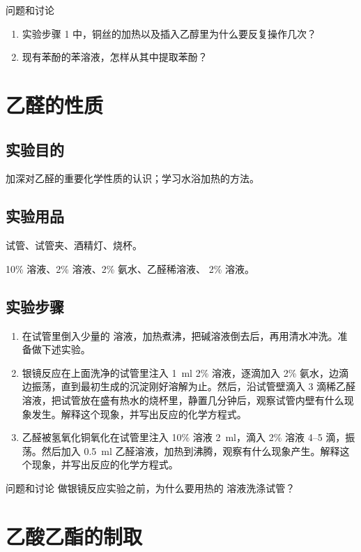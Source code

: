 \begin{Theorem}{问题和讨论}
\begin{enumerate}[1.]
  \item 实验步骤 1 中，铜丝的加热以及插入乙醇里为什么要反复操作几次？
  \item 现有苯酚的苯溶液，怎样从其中提取苯酚？
\end{enumerate}
\end{Theorem}

\section{乙醛的性质}
\subsection*{实验目的}
加深对乙醛的重要化学性质的认识；学习水浴加热的方法。

\subsection*{实验用品}
试管、试管夹、酒精灯、烧杯。

10\%  溶液、2\%  溶液、2\% 氨水、乙醛稀溶液、 2\%  溶液。
\subsection*{实验步骤}
\begin{enumerate}[1.]
  \item 在试管里倒入少量的  溶液，加热煮沸，把碱溶液倒去后，再用清水冲洗。准备做下述实验。
  \item 银镜反应\quad 在上面洗净的试管里注入 \qty{1}{ml} 2\%  溶液，逐滴加入 2\% 氨水，边滴边振荡，直到最初生成的沉淀刚好溶解为止。然后，沿试管壁滴入 3 滴稀乙醛溶液，把试管放在盛有热水的烧杯里，静置几分钟后，观察试管内壁有什么现象发生。解释这个现象，并写出反应的化学方程式。
  \item 乙醛被氢氧化铜氧化\quad 在试管里注入 10\%  溶液 \qty{2}{ml}，滴入 2\%  溶液 \numrange{4}{5} 滴，振荡。然后加入 \qty{0.5}{ml} 乙醛溶液，加热到沸腾，观察有什么现象产生。解释这个现象，并写出反应的化学方程式。
\end{enumerate}

\begin{Theorem}{问题和讨论}
做银镜反应实验之前，为什么要用热的  溶液洗涤试管？
\end{Theorem}


\section{乙酸乙酯的制取}
